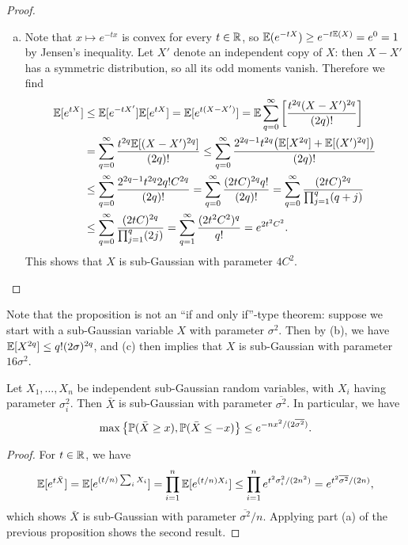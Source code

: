 \begin{proof}
\begin{enumerate}[(a)]
\item Note that $x \mapsto e^{-tx}$ is convex for every $t \in \mathbb R$, so $\mathbb E(e^{-tX}) \geq e^{-t \mathbb E(X)} = e^{0} = 1$ by Jensen's inequality. Let $X'$ denote an independent copy of $X$: then $X - X'$ has a symmetric distribution, so all its odd moments vanish. Therefore we find
\begin{align*}
	\mathbb E[e^{tX}] &\leq \mathbb E[e^{-tX'}] \mathbb E[e^{tX}] = \mathbb E[e^{t(X - X')}] = \mathbb E \sum_{q=0}^\infty \qty[\frac{t^{2q} (X - X')^{2q}}{(2q)!}] \\
	&= \sum_{q=0}^\infty \frac{t^{2q} \mathbb E[(X - X')^{2q}]}{(2q)!} \leq \sum_{q=0}^\infty \frac{2^{2q-1} t^{2q} \qty(\mathbb E[X^{2q}] + \mathbb E[(X')^{2q}])}{(2q)!} \\
	&\leq \sum_{q=0}^\infty  \frac{2^{2q - 1}t^{2q} 2 q! C^{2q}}{(2q)!} =\sum_{q=0}^\infty  \frac{(2tC)^{2q}q!}{(2q)!} = \sum_{q=0}^\infty \frac{(2tC)^{2q}}{\prod_{j=1}^q (q+j)} \\
	&\leq \sum_{q=0}^\infty \frac{(2tC)^{2q}}{\prod_{j=1}^q (2j)} = \sum_{q=1}^\infty \frac{(2t^2C^2)^q}{q!} = e^{2t^2C^2}.
\end{align*}
This shows that $X$ is sub-Gaussian with parameter $4C^2$. 
    \end{enumerate}
\end{proof}

Note that the proposition is not an ``if and only if''-type theorem: suppose we start with a sub-Gaussian variable $X$ with parameter $\sigma^2$. Then by (b), we have $\mathbb E[X^{2q}] \leq q!(2\sigma)^{2q}$, and (c) then implies that $X$ is sub-Gaussian with parameter $16\sigma^2$. 

\begin{theorem} \label{thm:hoeffding}
	Let $X_1, \dotsc, X_n$ be independent sub-Gaussian random variables, with $X_i$ having parameter $\sigma_i^2$. Then $\bar X$ is sub-Gaussian with parameter $\overline{\sigma^2}$. In particular, we have
	\[
	\max\qty{\mathbb P(\bar X \geq x), \mathbb P(\bar X \leq -x)} \leq e^{-nx^2/(2\overline{\sigma^2})}.
	\]
\end{theorem}

\begin{proof}
	For $t \in \mathbb R$, we have
	\[
	\mathbb E[e^{t\bar X}] = \mathbb E[e^{(t/n)\sum_i X_i}] = \prod_{i=1}^n \mathbb E[e^{(t/n)X_i}] \leq \prod_{i=1}^n e^{t^2\sigma_i^2/(2n^2)} = e^{t^2\overline{\sigma^2}/(2n)},
	\]
	which shows $\bar X$ is sub-Gaussian with parameter $\overline{\sigma^2}/n$. Applying part (a) of the previous proposition shows the second result. 
\end{proof}

